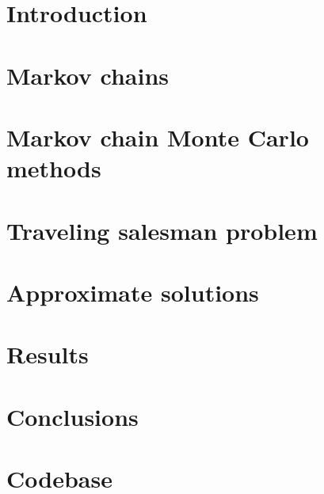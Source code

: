 




	
	\newpage
	
	
	\newpage
	
	\tableofcontents
	\listoftables
	\listoffigures
	\clearpage
	
	\section{Introduction}
		
		\clearpage
			
	\section{Markov chains}
		
		\clearpage
	
	\section{Markov chain Monte Carlo methods}
		
		\clearpage
	
	\section{Traveling salesman problem}
		
		\clearpage
	
	\section{Approximate solutions}
		
		\clearpage
	
	\section{Results}
		
		\clearpage
	
	\section{Conclusions}
		
		\clearpage
	
	\section{Codebase}
		
		\clearpage
	
	\clearpage
	\nocite{*}
	
		
	
